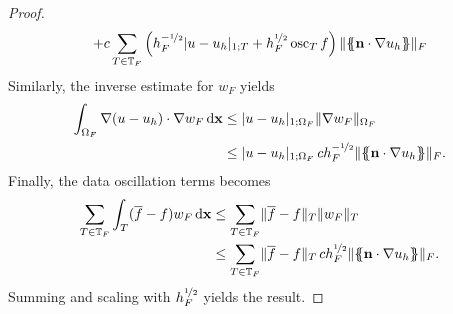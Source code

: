 \begin{proof}
\begin{align*}
      + c  \sum_{T\in\mathbb T_F} \left(h_F^{-\nicefrac12} \lvert u-u_h\rvert_{1;T}
      + h_F^{\nicefrac12}\operatorname{osc}_{T} f\right)\lVert\{\!\!\{\mathbf n\cdot\nabla u_h\}\!\!\}\rVert_F
    \end{align*}
    Similarly, the inverse estimate for $w_F$ yields
    \begin{align*}
      \int_{\Omega_F} \nabla (u-u_h)\cdot\nabla w_F \,\mathrm{d} \mathbf x
      &\le \lvert u-u_h\rvert_{1;\Omega_F} \lVert\nabla w_F\rVert_{\Omega_F}
      \\&\le \lvert u-u_h\rvert_{1;\Omega_F}
      \,c h_F^{-\nicefrac12}\lVert\{\!\!\{\mathbf n\cdot\nabla u_h\}\!\!\}\rVert_F.
    \end{align*}
    Finally, the data oscillation terms becomes
    \begin{align*}
      \sum_{T\in\mathbb T_F} \int_T (\overline f - f)w_F \,\mathrm{d} \mathbf x
      &\le \sum_{T\in\mathbb T_F} \lVert\overline f - f\rVert_T \lVert w_F\rVert_T
      \\&\le \sum_{T\in\mathbb T_F} \lVert\overline f - f\rVert_T
      \,c h_F^{\nicefrac12}\lVert\{\!\!\{\mathbf n\cdot\nabla u_h\}\!\!\}\rVert_F.
    \end{align*}
    Summing and scaling with $h_F^{\nicefrac12}$ yields the result.
\end{proof}

